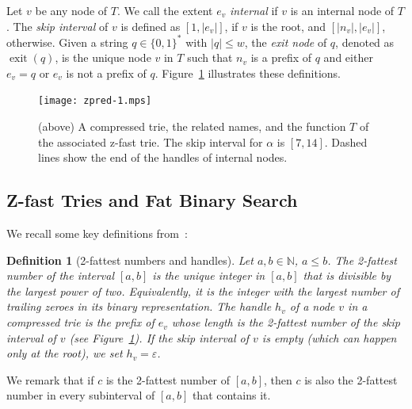 \documentclass[a4paper,11pt]{article}
\newtheorem{definition}[theorem]{Definition}
\newcommand{\eps}{\varepsilon}
\newcommand{\N}{\mathbb{N}}
\newcommand{\?}{\mskip1.5mu}
\DeclareMathOperator{\exit}{exit}
\begin{document}
Let $v$ be any node of $T$.
We call the extent $e_v$ 
\emph{internal} if $v$ is an internal node of $T$.
The \emph{skip interval} of $v$ is defined as
$[1, |e_v|]$, if $v$ is the root, and $[|n_v|, |e_v|]$, otherwise.
Given a string $q \in \{0, 1\}^*$ with $|q| \leq w$, the 
\emph{exit node} of $q$, denoted as $\exit(q)$, is the unique node
$v$ in $T$ such that $n_v$ is a prefix of $q$ and either
$e_v = q$ or $e_v$ is not a prefix of $q$.
Figure~\ref{fig:ztrie} illustrates these definitions.

\begin{figure}[t]
\centering
\texttt{[image: zpred-1.mps]}\qquad{}
\caption{(above) A compressed trie, the 
related names, and the function $T$ of the associated 
z-fast trie. The skip interval for $\alpha$ is $[7, 14]$. 
Dashed lines show the end of the handles of internal nodes.}
\label{fig:ztrie}
\end{figure}

\subsection{Z-fast Tries and Fat Binary Search}

We recall some key definitions from~\cite{BelazzouguiBoPaVi09}:

\begin{definition}[2-fattest numbers and handles] 
\label{def:twofattest}
Let $a, b \in \N$, $a \leq b$. The \emph{2-fattest number} 
of the interval $[a, b]$ is the unique integer in $[a, b]$ 
that is divisible by the largest power of two. Equivalently, 
it is the integer with the largest number of trailing zeroes 
in its binary representation. The \emph{handle} $h_v$ of a 
node $v$ in a compressed trie is the prefix of $e_v$ whose 
length is the 2-fattest number of the skip interval of $v$
(see Figure~\ref{fig:ztrie}). If the skip interval of $v$ 
is empty (which can happen only at the root), we set 
$h_v = \eps$.
\end{definition}

We remark that if $c$ is the 2-fattest number of $[a, b]$, then 
$c$ is also the 2-fattest number in every subinterval of $[a, b]$ 
that contains it.
\end{document}
